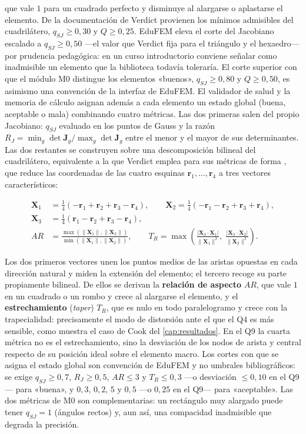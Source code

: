 que vale $1$ para un cuadrado perfecto y disminuye al alargarse o aplastarse el elemento. De la documentación de Verdict provienen los mínimos admisibles del cuadrilátero, $q_{SJ} \ge 0{,}30$ y $Q \ge 0{,}25$. EduFEM eleva el corte del Jacobiano escalado a $q_{SJ} \ge 0{,}50$ —el valor que Verdict fija para el triángulo y el hexaedro— por prudencia pedagógica: en un curso introductorio conviene señalar como inadmisible un elemento que la biblioteca todavía toleraría. El corte superior con que el módulo M0 distingue los elementos «buenos», $q_{SJ} \ge 0{,}80$ y $Q \ge 0{,}50$, es asimismo una convención de la interfaz de EduFEM. El validador de salud y la memoria de cálculo asignan además a cada elemento un estado global (buena, aceptable o mala) combinando cuatro métricas. Las dos primeras salen del propio Jacobiano: $q_{SJ}$ evaluado en los puntos de Gauss y la razón $R_J = \min_g \det\bm{J}_g / \max_g \det\bm{J}_g$ entre el menor y el mayor de sus determinantes. Las dos restantes se construyen sobre una descomposición bilineal del cuadrilátero, equivalente a la que Verdict emplea para sus métricas de forma \autocite{stimpson2007verdict}, que reduce las coordenadas de las cuatro esquinas $\bm{r}_1,\dots,\bm{r}_4$ a tres vectores característicos:

\begin{equation}
\begin{aligned}
\bm{X}_1 &= \tfrac{1}{4}\left(-\bm{r}_1 + \bm{r}_2 + \bm{r}_3 - \bm{r}_4\right), \qquad
\bm{X}_2 = \tfrac{1}{4}\left(-\bm{r}_1 - \bm{r}_2 + \bm{r}_3 + \bm{r}_4\right), \\[2pt]
\bm{X}_3 &= \tfrac{1}{4}\left(\bm{r}_1 - \bm{r}_2 + \bm{r}_3 - \bm{r}_4\right), \\[4pt]
AR &= \frac{\max(\|\bm{X}_1\|, \|\bm{X}_2\|)}{\min(\|\bm{X}_1\|, \|\bm{X}_2\|)}, \qquad
T_R = \max\left(\frac{|\bm{X}_3 \cdot \bm{X}_1|}{\|\bm{X}_1\|^2},\; \frac{|\bm{X}_3 \cdot \bm{X}_2|}{\|\bm{X}_2\|^2}\right).
\end{aligned}
\label{eq:descomposicion-bilineal}
\end{equation}

Los dos primeros vectores unen los puntos medios de las aristas opuestas en cada dirección natural y miden la extensión del elemento; el tercero recoge su parte propiamente bilineal. De ellos se derivan la \textbf{relación de aspecto} $AR$, que vale $1$ en un cuadrado o un rombo y crece al alargarse el elemento, y el \textbf{estrechamiento} (\emph{taper}) $T_R$, que es nulo en todo paralelogramo y crece con la trapecialidad: precisamente el modo de distorsión ante el que el Q4 es más sensible, como muestra el caso de Cook del \autoref{cap:resultados}. En el Q9 la cuarta métrica no es el estrechamiento, sino la desviación de los nodos de arista y central respecto de su posición ideal sobre el elemento macro. Los cortes con que se asigna el estado global son convención de EduFEM y no umbrales bibliográficos: se exige $q_{SJ} \ge 0{,}7$, $R_J \ge 0{,}5$, $AR \le 3$ y $T_R \le 0{,}3$ —o desviación $\le 0{,}10$ en el Q9— para «buena», y $0{,}3$, $0{,}2$, $5$ y $0{,}5$ —o $0{,}25$ en el Q9— para «aceptable». Las dos métricas de M0 son complementarias: un rectángulo muy alargado puede tener $q_{SJ} = 1$ (ángulos rectos) y, aun así, una compacidad inadmisible que degrada la precisión.

